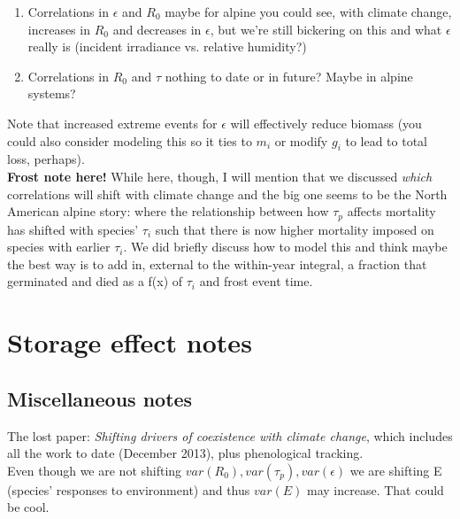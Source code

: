 \documentclass[11pt,a4paper,oneside]{article}
\begin{document}
\begin{enumerate}
\item Correlations in \(\epsilon\) and \(R_{0}\) maybe for alpine you could see, with climate change, increases in \(R_{0}\)  and decreases in \(\epsilon\), but we're still bickering on this and what \(\epsilon\) really is (incident irradiance vs. relative humidity?)
\item Correlations in \(R_{0}\) and \(\tau\) nothing to date or in future? Maybe in alpine systems?
\end{enumerate}

Note that increased extreme events for \(\epsilon\)  will effectively reduce biomass (you could also consider modeling this so it ties to \(m_{i}\) or modify \(g_{i}\) to lead to total loss, perhaps).\\

{\bf Frost note here!} While here, though, I will mention that we discussed \emph{which} correlations will shift with climate change and the big one seems to be the North American alpine story: where the relationship between how \(\tau_{p}\) affects mortality has shifted with species' \(\tau_{i}\) such that there is now higher mortality imposed on species with earlier \(\tau_{i}\). We did briefly discuss how to model this and think maybe the best way is to add in, external to the within-year integral, a fraction that germinated and died as a f(x) of \(\tau_{i}\)  and frost event time.\\


\section{Storage effect notes}

\subsection{Miscellaneous notes}

\noindet The lost paper: \emph{Shifting drivers of coexistence with climate change}, which includes all the work to date (December 2013), plus phenological tracking.\\

 Even though we are not shifting \(var(R_{0}), var(\tau_{p}), var(\epsilon)\) we are shifting E (species' responses to environment) and thus \(var(E)\) may increase. That could be cool.\\
\end{document}
